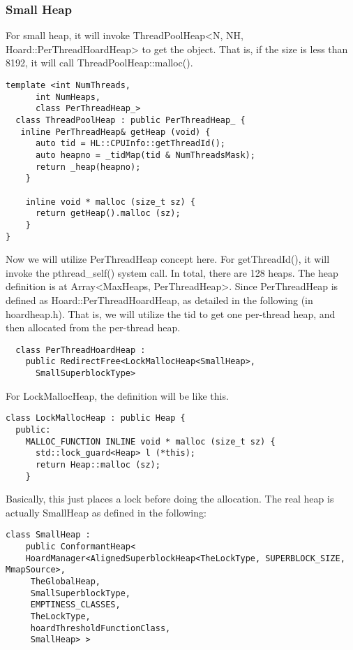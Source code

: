 \subsubsection{Small Heap}
For small heap, it will invoke ThreadPoolHeap<N, NH, Hoard::PerThreadHoardHeap> to get the object. That is, if the size is less than 8192, it will call ThreadPoolHeap::malloc(). 


\begin{lstlisting}
template <int NumThreads,
      int NumHeaps,
      class PerThreadHeap_>
  class ThreadPoolHeap : public PerThreadHeap_ {	
   inline PerThreadHeap& getHeap (void) {
      auto tid = HL::CPUInfo::getThreadId();
      auto heapno = _tidMap(tid & NumThreadsMask);
      return _heap(heapno);
    }

    inline void * malloc (size_t sz) {
      return getHeap().malloc (sz);
    }
}
\end{lstlisting}

Now we will utilize PerThreadHeap concept here. For getThreadId(), it will invoke the pthread\_self() system call. In total, there are 128 heaps. The heap definition is at Array<MaxHeaps, PerThreadHeap>. Since PerThreadHeap is defined as Hoard::PerThreadHoardHeap, as detailed in the following (in hoardheap.h). That is, we will utilize the tid to get one per-thread heap, and then allocated from the per-thread heap. 

\begin{lstlisting}
  class PerThreadHoardHeap :
    public RedirectFree<LockMallocHeap<SmallHeap>,
      SmallSuperblockType>	
\end{lstlisting}

For LockMallocHeap, the definition will be like this. 
\begin{lstlisting}
class LockMallocHeap : public Heap {
  public:
    MALLOC_FUNCTION INLINE void * malloc (size_t sz) {
      std::lock_guard<Heap> l (*this);
      return Heap::malloc (sz);
    }	
\end{lstlisting}

Basically, this just places a lock before doing the allocation. The real heap is actually SmallHeap as defined in the following:

\begin{lstlisting}
class SmallHeap : 
    public ConformantHeap<
    HoardManager<AlignedSuperblockHeap<TheLockType, SUPERBLOCK_SIZE, MmapSource>,
     TheGlobalHeap,
     SmallSuperblockType,
     EMPTINESS_CLASSES,
     TheLockType,
     hoardThresholdFunctionClass,
     SmallHeap> >	
\end{lstlisting}

